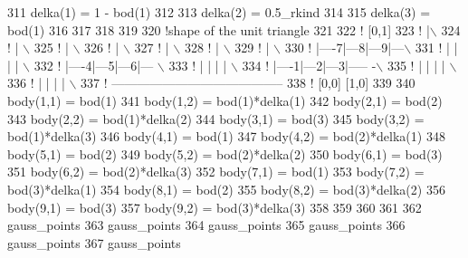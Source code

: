 \begin{DoxyCode}
{{{{{{{{{{{{{{{{{{{{{{{{{{{{{{{{{{311               delka(1) = 1 - bod(1)
312 
313               delka(2) = 0.5\_rkind
314 
315               delka(3) = bod(1)  
316 
317 
318 
319 
320             !shape of the unit triangle
321 
322           \textcolor{comment}{! [0,1]}
323           \textcolor{comment}{! |\(\backslash\)}
324           \textcolor{comment}{! |  \(\backslash\)}
325           \textcolor{comment}{! |     \(\backslash\)}
326           \textcolor{comment}{! |       \(\backslash\)}
327           \textcolor{comment}{! |         \(\backslash\)}
328           \textcolor{comment}{! |           \(\backslash\)}
329           \textcolor{comment}{! |               \(\backslash\) }
330           \textcolor{comment}{! |----7|---8|---9|---\(\backslash\) }
331           \textcolor{comment}{! |     |    |    |    \(\backslash\)}
332           \textcolor{comment}{! |----4|---5|---6|---  \(\backslash\)}
333           \textcolor{comment}{! |     |    |    |       \(\backslash\)}
334           \textcolor{comment}{! |----1|---2|---3|-----   -\(\backslash\)       }
335           \textcolor{comment}{! |     |    |    |           \(\backslash\) }
336           \textcolor{comment}{! |     |    |    |             \(\backslash\)}
337           \textcolor{comment}{! -----------------------------------------}
338           \textcolor{comment}{! [0,0]                          [1,0]}
339 
340               body(1,1) = bod(1)
341               body(1,2) = bod(1)*delka(1)
342               body(2,1) = bod(2)
343               body(2,2) = bod(1)*delka(2)
344               body(3,1) = bod(3)
345               body(3,2) = bod(1)*delka(3)
346               body(4,1) = bod(1)
347               body(4,2) = bod(2)*delka(1)
348               body(5,1) = bod(2)
349               body(5,2) = bod(2)*delka(2)
350               body(6,1) = bod(3)
351               body(6,2) = bod(2)*delka(3)
352               body(7,1) = bod(1)
353               body(7,2) = bod(3)*delka(1)
354               body(8,1) = bod(2)
355               body(8,2) = bod(3)*delka(2)
356               body(9,1) = bod(3)
357               body(9,2) = bod(3)*delka(3)
358 
359             
360               
361               
362               gauss_points%
363               gauss_points%
364               gauss_points%
365               gauss_points%
366               gauss_points%
367               gauss_points%
}}}}}}}}}}}}}}}}}}}}}}}}}}}}}}}}}}
\end{DoxyCode}
